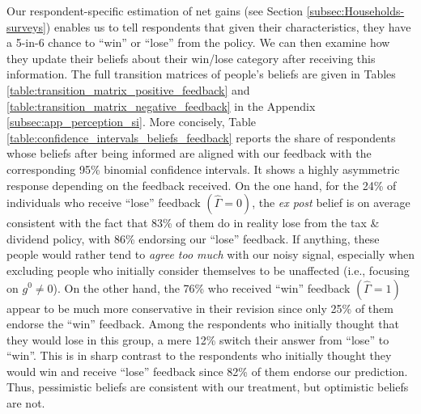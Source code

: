 \documentclass[12pt]{article} %
\begin{document}
Our respondent-specific estimation of net gains (see Section \ref{subsec:Households-surveys}) enables us to tell respondents that given their characteristics, they have a 5-in-6 chance to ``win'' or ``lose'' from the policy. We can then examine how they update their beliefs about their win/lose category after receiving this information. The full transition matrices of people's beliefs are given in Tables \ref{table:transition_matrix_positive_feedback} and \ref{table:transition_matrix_negative_feedback} in the Appendix \ref{subsec:app_perception_si}. More concisely, Table \ref{table:confidence_intervals_beliefs_feedback} reports the share of respondents whose beliefs after being informed are aligned with our feedback with the corresponding 95\% binomial confidence intervals. It shows a highly asymmetric response depending on the feedback received. On the one hand, for the 24\% of individuals who receive ``lose'' feedback $(\widehat{\Gamma} = 0)$, the \textit{ex post} belief is on average consistent with the fact that 83\% of them do in reality lose from the tax \& dividend policy, with 86\% endorsing our ``lose'' feedback. If anything, these people would rather tend to \textit{agree too much} with our noisy signal, especially when excluding people who initially consider themselves to be unaffected (i.e., focusing on $g^0 \neq 0$). On the other hand, the 76\% who received ``win'' feedback $(\widehat{\Gamma} = 1)$ appear to be much more conservative in their revision since only 25\% of them endorse the ``win'' feedback. Among the respondents who initially thought that they would lose in this group, a mere 12\% switch their answer from ``lose'' to ``win''. This is in sharp contrast to the respondents who initially thought they would win and receive ``lose'' feedback since 82\% of them endorse our prediction. Thus, pessimistic beliefs are consistent with our treatment, but optimistic beliefs are not.

\end{document}
